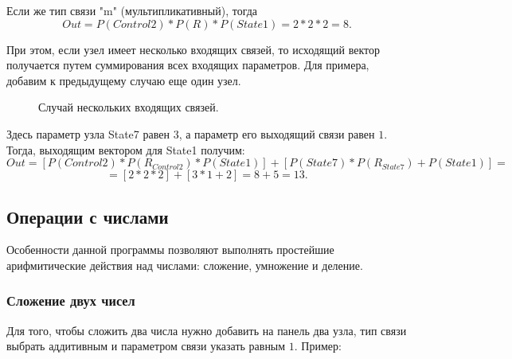 \documentclass{article}
\numberwithin{equation}{section}
\begin{document}
 \begin{figure}[h]
\label{ris:image4}
\end{figure}
	
Если же тип связи "m" (мультипликативный), тогда
$$
Out = P(Control2) * P(R) * P(State1) = 2 * 2 * 2 = 8.
$$ 
 \begin{figure}[h]
\label{ris:image5}
\end{figure}	


\newpage
При этом, если узел имеет несколько входящих связей, то исходящий вектор получается путем суммирования всех входящих параметров. Для примера, добавим к предыдущему случаю еще один узел.

\begin{figure}[h]
\caption{Случай нескольких входящих связей.}
\label{ris:image6}
\end{figure}


Здесь параметр узла State7 равен $3$, а параметр его выходящий связи равен $1$. Тогда, выходящим вектором для State1 получим: 
$$
Out = \left[ P(Control2) * P(R_{Control2}) * P(State1)\right] + \left[P(State7) * P(R_{State7}) + P(State1)\right]=$$ $$  = [2 * 2 * 2] + [3 *1 + 2] = 8 + 5 = 13.
$$ 

\begin{figure}[h]
\label{ris:image7}
\end{figure}


\qquad 

\newpage
\subsection{Операции с числами}


\qquad Особенности данной программы позволяют выполнять простейшие арифмитические действия над числами: сложение, умножение и деление.

\subsubsection{Сложение двух чисел}

\qquad Для того, чтобы сложить два числа нужно добавить на панель два узла, тип связи выбрать аддитивным и параметром связи указать равным $1$.
Пример:
\end{document}
